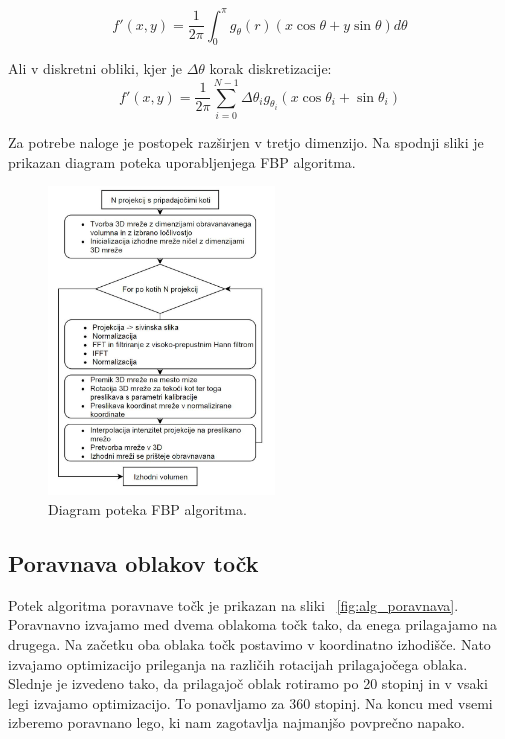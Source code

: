 \documentclass[journal,a4paper,twoside]{sty/IEEEtran}
\begin{document}
\begin{equation}
f'(x,y) = \frac{1}{2\pi} \int_{0}^{\pi} g_{\theta}(r) (x \cos\theta + y \sin \theta)d\theta
\end{equation}

Ali v diskretni obliki, kjer je $\Delta\theta$ korak diskretizacije:
\begin{equation}
f'(x,y) = \frac{1}{2\pi} \sum\limits_{i=0}^{N-1} \Delta\theta_i g_{\theta_i}(x \cos\theta_i + \sin\theta_i)
\end{equation}

Za potrebe naloge je postopek razširjen v tretjo dimenzijo. Na spodnji sliki je prikazan diagram poteka uporabljenjega FBP algoritma.

\begin{figure}[H]
	\centerline{\includegraphics[width=6cm]{fig/FBPflow}}
	\caption{Diagram poteka FBP algoritma.}
	\label{fig:fbp_flow}
\end{figure}

\subsection{Poravnava oblakov točk}
%
Potek algoritma poravnave točk je prikazan na sliki ~\ref{fig:alg_poravnava}. Poravnavno izvajamo med dvema oblakoma točk tako, da enega prilagajamo na drugega. Na začetku oba oblaka točk postavimo v koordinatno izhodišče. Nato izvajamo optimizacijo prileganja na različih rotacijah prilagajočega oblaka. Slednje je izvedeno tako, da prilagajoč oblak rotiramo po 20 stopinj in v vsaki legi izvajamo optimizacijo. To ponavljamo za 360 stopinj. Na koncu med vsemi izberemo poravnano lego, ki nam zagotavlja najmanjšo povprečno napako. 
\end{document}
